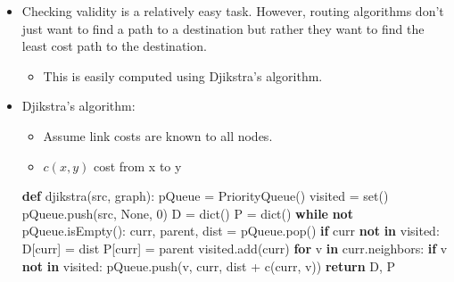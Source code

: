 \documentclass[]{article}
\newenvironment{Shaded}{}{}
\newcommand{\BuiltInTok}[1]{#1}
\newcommand{\ControlFlowTok}[1]{\textcolor[rgb]{0.00,0.44,0.13}{\textbf{#1}}}
\newcommand{\DecValTok}[1]{\textcolor[rgb]{0.25,0.63,0.44}{#1}}
\newcommand{\KeywordTok}[1]{\textcolor[rgb]{0.00,0.44,0.13}{\textbf{#1}}}
\newcommand{\NormalTok}[1]{#1}
\newcommand{\OperatorTok}[1]{\textcolor[rgb]{0.40,0.40,0.40}{#1}}
\newcommand{\VariableTok}[1]{\textcolor[rgb]{0.10,0.09,0.49}{#1}}
\providecommand{\tightlist}{%
  \setlength{\itemsep}{0pt}\setlength{\parskip}{0pt}}
\begin{document}
\begin{itemize}
\tightlist
\item
  Checking validity is a relatively easy task. However, routing
  algorithms don't just want to find a path to a destination but rather
  they want to find the least cost path to the destination.

  \begin{itemize}
  \tightlist
  \item
    This is easily computed using Djikstra's algorithm.
  \end{itemize}
\item
  Djikstra's algorithm:

  \begin{itemize}
  \tightlist
  \item
    Assume link costs are known to all nodes.
  \item
    \(c(x,y)\) cost from x to y
  \end{itemize}

\begin{Shaded}
\begin{Highlighting}[]
\KeywordTok{def}\NormalTok{ djikstra(src, graph):}
\NormalTok{    pQueue }\OperatorTok{=}\NormalTok{ PriorityQueue()}
\NormalTok{    visited }\OperatorTok{=} \BuiltInTok{set}\NormalTok{()}
\NormalTok{    pQueue.push(src, }\VariableTok{None}\NormalTok{, }\DecValTok{0}\NormalTok{)}
\NormalTok{    D }\OperatorTok{=} \BuiltInTok{dict}\NormalTok{()}
\NormalTok{    P }\OperatorTok{=} \BuiltInTok{dict}\NormalTok{()}
    \ControlFlowTok{while} \KeywordTok{not}\NormalTok{ pQueue.isEmpty():}
\NormalTok{        curr, parent, dist }\OperatorTok{=}\NormalTok{ pQueue.pop()}
        \ControlFlowTok{if}\NormalTok{ curr }\KeywordTok{not} \KeywordTok{in}\NormalTok{ visited:}
\NormalTok{            D[curr] }\OperatorTok{=}\NormalTok{ dist}
\NormalTok{            P[curr] }\OperatorTok{=}\NormalTok{ parent}
\NormalTok{            visited.add(curr)}
            \ControlFlowTok{for}\NormalTok{ v }\KeywordTok{in}\NormalTok{ curr.neighbors:}
                \ControlFlowTok{if}\NormalTok{ v }\KeywordTok{not} \KeywordTok{in}\NormalTok{ visited:}
\NormalTok{                    pQueue.push(v, curr, dist }\OperatorTok{+}\NormalTok{ c(curr, v))}
    \ControlFlowTok{return}\NormalTok{  D, P}
\end{Highlighting}
\end{Shaded}


\end{itemize}
\end{document}
